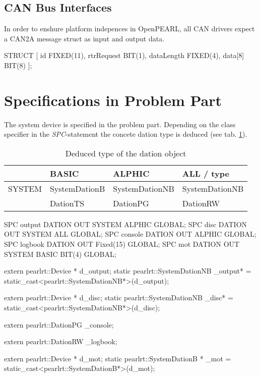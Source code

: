 \subsection{CAN Bus Interfaces}
In order to enshure platform indepences in OpenPEARL, all CAN drivers expect 
a CAN2A message struct as input and output data.
\begin{PEARLCode}
STRUCT [
   id         FIXED(11),
   rtrRequest BIT(1),
   dataLength FIXED(4),
   data[8]    BIT(8)
];
\end{PEARLCode}

\section{Specifications in Problem Part}
The system device is specified in the problem part.
Depending on the class specifier in the {\em SPC}-statement the concete 
dation type is deduced (see tab. \ref{dationTypes}).

\begin{table}[bpht]
\begin{tabular}{l|l|l|l}
  & BASIC & ALPHIC & ALL / type \\
\hline
SYSTEM & SystemDationB & SystemDationNB & SystemDationNB \\
 & DationTS & DationPG & DationRW \\
\hline
\end{tabular}
\caption{Deduced type of the dation object}
\label{dationTypes}
\end{table}


\begin{PEARLCode}
SPC output DATION OUT SYSTEM ALPHIC GLOBAL;
SPC disc DATION OUT SYSTEM ALL GLOBAL;
SPC console DATION OUT ALPHIC GLOBAL;
SPC logbook DATION OUT Fixed(15) GLOBAL;
SPC mot DATION OUT SYSTEM BASIC BIT(4) GLOBAL;
\end{PEARLCode}

\begin{CppCode}
extern pearlrt::Device * d_output;
static pearlrt::SystemDationNB _output* = 
             static_cast<pearlrt::SystemDationNB*>(d_output);

extern pearlrt::Device * d_disc;
static pearlrt::SystemDationNB _disc* = 
             static_cast<pearlrt::SystemDationNB*>(d_disc);

extern pearlrt::DationPG _console;

extern pearlrt::DationRW _logbook;

extern pearlrt::Device * d_mot;
static pearlrt::SystemDationB * _mot = 
             static_cast<pearlrt::SystemDationB*>(d_mot);
\end{CppCode}

